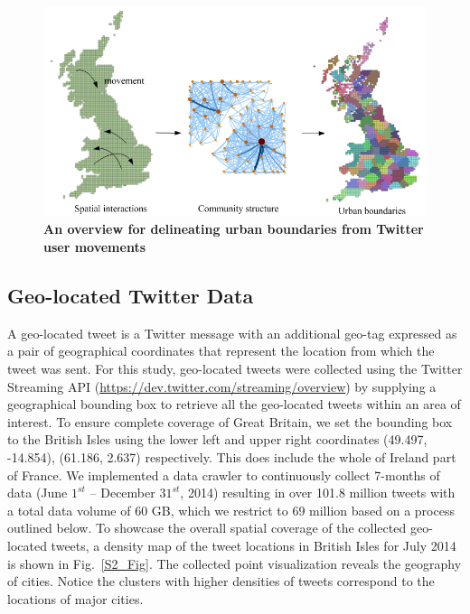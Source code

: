 \documentclass[10pt,letterpaper]{article}
\begin{document}
\begin{figure}[ht]
\includegraphics[width=1\linewidth]{./figure/PNG/S1_overview_Fig_2}
\caption{{\bf An overview for delineating urban boundaries from Twitter user movements}}
\label{S1_Fig}
\end{figure}

\subsection*{Geo-located Twitter Data}
A geo-located tweet is a Twitter message with an additional geo-tag expressed as a pair of geographical coordinates that represent the location from which the tweet was sent.
For this study, geo-located tweets were collected using the Twitter Streaming API (\url{https://dev.twitter.com/streaming/overview}) by supplying a geographical bounding box to retrieve all the  geo-located tweets within an area of interest.
To ensure complete coverage of Great Britain, we set the bounding box to the British Isles using the lower left and upper right coordinates (49.497, -14.854), (61.186, 2.637) respectively. This does include the whole of Ireland part of France.
We implemented a data crawler to continuously collect 7-months of data (June $1^{st}$ -- December $31^{st}$, 2014) resulting in over 101.8 million tweets with a total data volume of 60 GB, which we restrict to 69 million based on a process outlined below. 
To showcase the overall spatial coverage of the collected geo-located tweets, a density map of the tweet locations in British Isles for July 2014 is shown in Fig.~\ref{S2_Fig}.
The collected point visualization reveals the geography of cities.
Notice the clusters with higher densities of tweets correspond to the locations of major cities.
\end{document}
